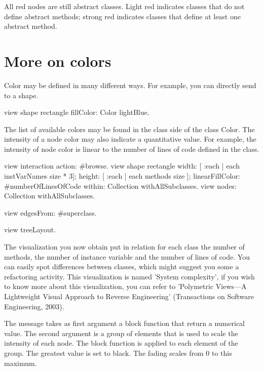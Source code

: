 \documentclass[a4paper,10pt,twoside]{book}
\begin{document}
All red nodes are still abstract classes. Light red indicates classes that do not define abstract methods; strong red indicates classes that define at least one abstract method.

\section{More on colors}

Color may be defined in many different ways. For example, you can directly send  to a shape.

\begin{code}{}
view shape rectangle
  fillColor: Color lightBlue.
\end{code}

The list of available colors may be found in the class side of the class Color. The intensity of a node color may also indicate a quantitative value. For example, the intensity of node color is linear to the number of lines of code defined in the class.

\begin{code}{}
view interaction action: #browse.
view shape rectangle
  width: [ :each | each instVarNames size * 3];
  height: [ :each | each methods size ];
  linearFillColor: #numberOfLinesOfCode within: Collection withAllSubclasses.
view nodes: Collection withAllSubclasses.

view edgesFrom: #superclass.

view treeLayout.
\end{code}

The visualization you now obtain put in relation for each class the number of methods, the number of instance variable and the number of lines of code. You can easily spot differences between classes, which might suggest you some a refactoring activity. This visualization is named 'System complexity', if you wish to know more about this visualization, you can refer to 'Polymetric Views---A Lightweight Visual Approach to Reverse Engineering' (Transactions on Software Engineering, 2003). 

 The message  takes as first argument a block function that return a numerical value. The second argument is a group of elements that is used to scale the intensity of each node. The block function is applied to each element of the group. The greatest value is set to black. The fading scales from 0 to this maximum.
\end{document}
